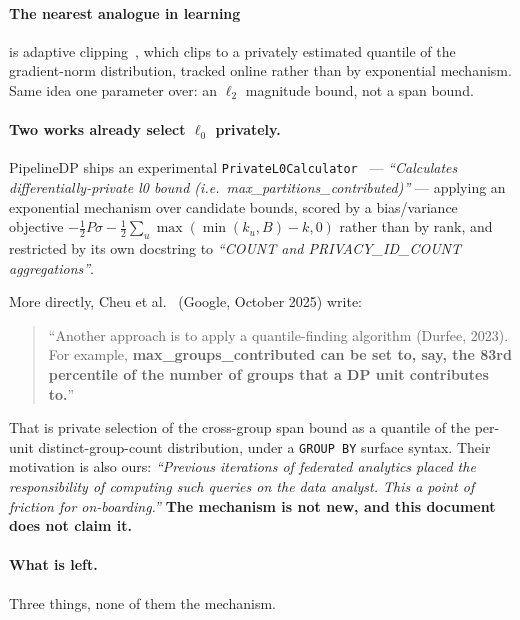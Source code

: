 \documentclass[11pt,a4paper]{article}
\begin{document}
\paragraph{The nearest analogue in learning} is adaptive clipping~\cite{andrew2021}, which clips to
a privately estimated quantile of the gradient-norm distribution, tracked online rather than by
exponential mechanism. Same idea one parameter over: an $\ell_2$ magnitude bound, not a span bound.

\paragraph{Two works already select $\ell_0$ privately.} PipelineDP ships an experimental
\texttt{PrivateL0Calculator}~\cite{pipelinedp_l0} --- \emph{``Calculates differentially-private l0
bound (i.e.\ max\_partitions\_contributed)''} --- applying an exponential mechanism over candidate
bounds, scored by a bias/variance objective
$-\tfrac12 P\sigma - \tfrac12 \sum_u \max(\min(k_u, B) - k, 0)$ rather than by rank, and restricted
by its own docstring to \emph{``COUNT and PRIVACY\_ID\_COUNT aggregations''}.

More directly, Cheu et al.~\cite{genai2025} (Google, October 2025) write:

\begin{quote}
``Another approach is to apply a quantile-finding algorithm (Durfee, 2023). For example,
\textbf{max\_groups\_contributed can be set to, say, the 83rd percentile of the number of groups
that a DP unit contributes to.}''
\end{quote}

That is private selection of the cross-group span bound as a quantile of the per-unit
distinct-group-count distribution, under a \texttt{GROUP BY} surface syntax. Their motivation is
also ours: \emph{``Previous iterations of federated analytics placed the responsibility of computing
such queries on the data analyst. This a point of friction for on-boarding.''} \textbf{The mechanism
is not new, and this document does not claim it.}

\paragraph{What is left.} Three things, none of them the mechanism.
\end{document}

